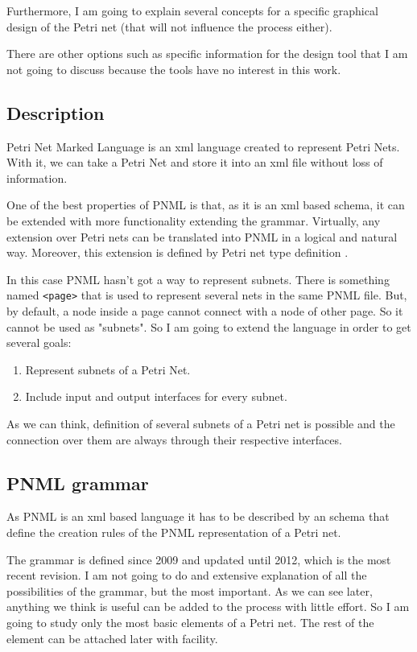 Furthermore, I am going to explain several concepts for a specific graphical
design of the Petri net (that will not influence the process either).

There are other options such as specific information for the design tool
that I am not going to discuss because the tools have no interest in this work. 

\subsection{Description}
Petri Net Marked Language is an xml language created to represent Petri Nets. With it, we can take a Petri Net and store it into an xml file without loss of information.

One of the best properties of PNML is that, as it is an xml based schema,
it can be extended with more functionality extending the grammar.
Virtually, any extension over Petri nets can be translated into PNML in a logical and natural way.
Moreover, this extension is defined by Petri net type definition \cite{PNML-Billington2003483,PNML-iso/iec-15909-2:2011}.
 

In this case PNML hasn't got a way to represent subnets. There is something named \texttt{<page>} 
that is used to represent several nets in the same PNML file. But, by default,
a node inside a page cannot connect with a node of other page. So it cannot
be used as "subnets". So I am going to extend the language in order to get several goals:
\begin{enumerate}
\item Represent subnets of a Petri Net.
\item Include input and output interfaces for every subnet.
\end{enumerate}

As we can think, definition of several subnets of a Petri net is possible
and the connection over them are always through their respective interfaces.

\subsection{PNML grammar}

As PNML is an xml based language it has to be described by an schema that define the creation rules of the PNML representation of a Petri net.

The grammar is defined since 2009 and updated until
2012, which is the most recent revision.
I am not going to do and extensive explanation of all the possibilities
of the grammar, but the most important. As we can see later, anything we think is useful can be added to the process with little effort.
So I am going to study only the most basic elements of a Petri net. The rest of the element can be attached later with facility. 

